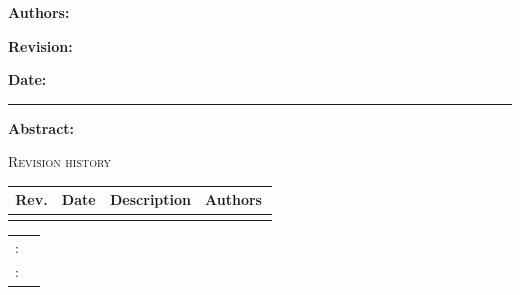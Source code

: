 \noindent
\begin{minipage}[t]{0.46\linewidth}
	\raggedright
	\textbf{Authors:}\\[2pt]
	\DocAuthor
\end{minipage}%
\hfill
\begin{minipage}[t]{0.22\linewidth}
	\centering
	\textbf{Revision:}\\[2pt]
	\DocRevision
\end{minipage}%
\hfill
\begin{minipage}[t]{0.30\linewidth}
	\raggedleft
	\textbf{Date:}\\[2pt]
	\DocDate
\end{minipage}

\vspace{10pt}
\noindent\rule{\linewidth}{0.8pt}

\vspace{24pt plus 4pt minus 12pt}

\begin{center}
	\begin{minipage}{0.88\linewidth}
		\footnotesize
		\begin{onehalfspace}
			\textbf{Abstract:} \DocAbstract
		\end{onehalfspace}
	\end{minipage}
\end{center}

\vfill

\begin{center}
	\begin{minipage}{0.96\linewidth}
		\centering
		{\footnotesize\scshape Revision history}\\[6pt]
		{\footnotesize
			\begin{tabular}{@{}cl>{\raggedright\arraybackslash}p{0.36\linewidth}>{\raggedright\arraybackslash}p{0.28\linewidth}@{}}
				\toprule
				\textbf{Rev.} & \textbf{Date} & \textbf{Description} & \textbf{Authors} \\
				\midrule
				\RevisionHistory
				\bottomrule
			\end{tabular}}
	\end{minipage}
\end{center}

\vspace{18pt plus 4pt minus 10pt}

\noindent
\begin{tabular}{@{} r @{\quad} l @{}}
	\textsc{\MetaLabelA:} & {\href{\MetaValueAUrl}{\MetaValueALabel}} \\[3pt]
	\textsc{\MetaLabelB:} & {\MetaValueB}       \\[3pt]
\end{tabular}

\newpage
{}
\setcounter{page}{1}
